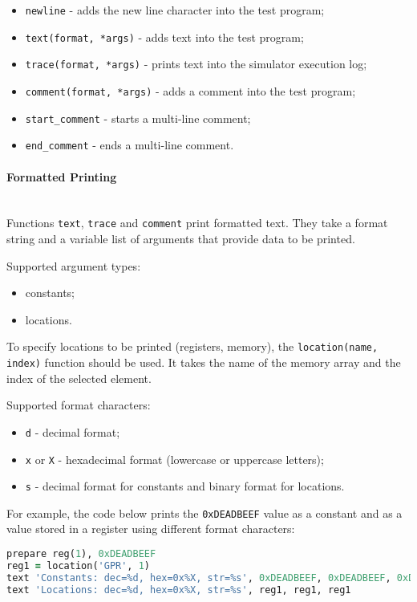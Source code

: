 \documentclass[oneside,final,12pt]{extreport}
\begin{document}
\begin{itemize}
\item \texttt{newline} - adds the new line character into the test program;
\item \texttt{text(format, *args)} - adds text into the test program;
\item \texttt{trace(format, *args)} - prints text into the simulator execution log;
\item \texttt{comment(format, *args)} - adds a comment into the test program;
\item \texttt{start{\_}comment} - starts a multi-line comment;
\item \texttt{end{\_}comment} - ends a multi-line comment.
\end{itemize}

\paragraph{Formatted Printing} ~\\

Functions \texttt{text}, \texttt{trace} and \texttt{comment} print formatted text.
They take a format string and a variable list of arguments that provide data to be
printed.

Supported argument types:
\begin{itemize}
\item constants;
\item locations.
\end{itemize}

To specify locations to be printed (registers, memory), the \texttt{location(name, index)}
function should be used. It takes the name of the memory array and the index of the selected
element.

Supported format characters:
\begin{itemize}
\item \texttt{d} - decimal format;
\item \texttt{x} or \texttt{X} - hexadecimal format (lowercase or uppercase letters);
\item \texttt{s} - decimal format for constants and binary format for locations.
\end{itemize}

For example, the code below prints the \texttt{0xDEADBEEF} value as a constant and as
a value stored in a register using different format characters:

\begin{lstlisting}[language=ruby]
prepare reg(1), 0xDEADBEEF
reg1 = location('GPR', 1)
text 'Constants: dec=%d, hex=0x%X, str=%s', 0xDEADBEEF, 0xDEADBEEF, 0xDEADBEEF
text 'Locations: dec=%d, hex=0x%X, str=%s', reg1, reg1, reg1
\end{lstlisting}
\end{document}
